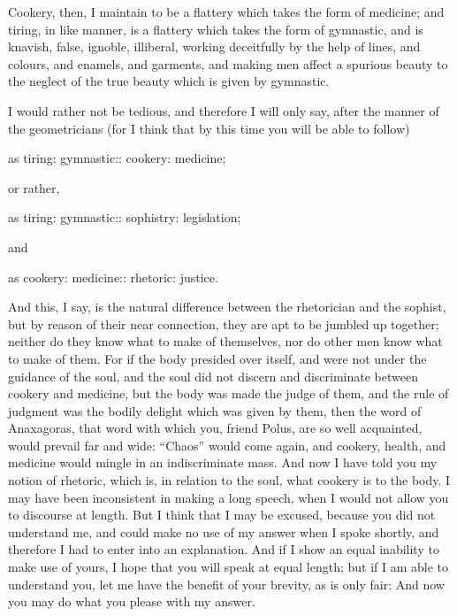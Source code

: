 \documentclass[11pt,letter]{article}
\begin{document}
\par  Cookery, then, I maintain to be a flattery which takes the form of medicine; and tiring, in like manner, is a flattery which takes the form of gymnastic, and is knavish, false, ignoble, illiberal, working deceitfully by the help of lines, and colours, and enamels, and garments, and making men affect a spurious beauty to the neglect of the true beauty which is given by gymnastic.

\par  I would rather not be tedious, and therefore I will only say, after the manner of the geometricians (for I think that by this time you will be able to follow)

\par  as tiring: gymnastic:: cookery: medicine;

\par  or rather,

\par  as tiring: gymnastic:: sophistry: legislation;

\par  and

\par  as cookery: medicine:: rhetoric: justice.

\par  And this, I say, is the natural difference between the rhetorician and the sophist, but by reason of their near connection, they are apt to be jumbled up together; neither do they know what to make of themselves, nor do other men know what to make of them. For if the body presided over itself, and were not under the guidance of the soul, and the soul did not discern and discriminate between cookery and medicine, but the body was made the judge of them, and the rule of judgment was the bodily delight which was given by them, then the word of Anaxagoras, that word with which you, friend Polus, are so well acquainted, would prevail far and wide: “Chaos” would come again, and cookery, health, and medicine would mingle in an indiscriminate mass. And now I have told you my notion of rhetoric, which is, in relation to the soul, what cookery is to the body. I may have been inconsistent in making a long speech, when I would not allow you to discourse at length. But I think that I may be excused, because you did not understand me, and could make no use of my answer when I spoke shortly, and therefore I had to enter into an explanation. And if I show an equal inability to make use of yours, I hope that you will speak at equal length; but if I am able to understand you, let me have the benefit of your brevity, as is only fair: And now you may do what you please with my answer.
\end{document}
